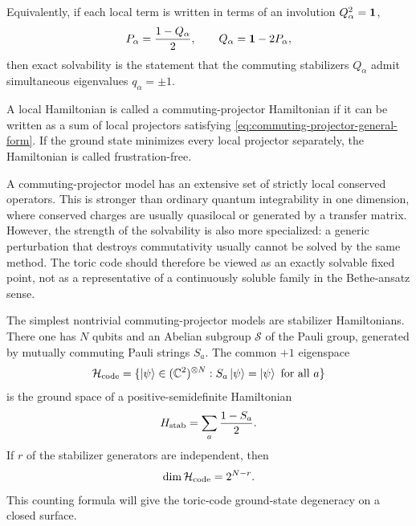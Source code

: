 Equivalently, if each local term is written in terms of an involution
\(Q_{\alpha}^2=\mathbf{1}\),
\begin{equation}
\label{eq:involution-projector-relation}
    P_{\alpha}=\frac{1-Q_{\alpha}}{2},
    \qquad
    Q_{\alpha}=\mathbf{1}-2P_{\alpha},
\end{equation}
then exact solvability is the statement that the commuting stabilizers
\(Q_{\alpha}\) admit simultaneous eigenvalues \(q_{\alpha}=\pm1\).

\begin{definition}
A local Hamiltonian is called a commuting-projector Hamiltonian if it can be
written as a sum of local projectors satisfying \cref{eq:commuting-projector-general-form}.
If the ground state minimizes every local projector separately, the Hamiltonian
is called frustration-free.
\end{definition}

\begin{remark}
A commuting-projector model has an extensive set of strictly local conserved
operators.  This is stronger than ordinary quantum integrability in one
dimension, where conserved charges are usually quasilocal or generated by a
transfer matrix.  However, the strength of the solvability is also more
specialized: a generic perturbation that destroys commutativity usually cannot be
solved by the same method.  The toric code should therefore be viewed as an
exactly solvable fixed point, not as a representative of a continuously soluble
family in the Bethe-ansatz sense.
\end{remark}

The simplest nontrivial commuting-projector models are stabilizer Hamiltonians.
There one has \(N\) qubits and an Abelian subgroup \(\mathcal{S}\) of the
Pauli group, generated by mutually commuting Pauli strings \(S_a\).  The common
\(+1\) eigenspace
\begin{equation}
\label{eq:stabilizer-code-space}
    \mathcal{H}_{\rm code}
    =
    \{\left|\psi\right\rangle\in(\mathbb{C}^2)^{\otimes N}:S_a\left|\psi\right\rangle=\left|\psi\right\rangle
    \text{ for all }a\}
\end{equation}
is the ground space of a positive-semidefinite Hamiltonian
\begin{equation}
\label{eq:stabilizer-positive-hamiltonian}
    H_{\rm stab}=\sum_a \frac{1-S_a}{2} .
\end{equation}
If \(r\) of the stabilizer generators are independent, then
\begin{equation}
\label{eq:stabilizer-dimension-counting}
    \dim\mathcal{H}_{\rm code}=2^{N-r} .
\end{equation}
This counting formula will give the toric-code ground-state degeneracy on a
closed surface.

